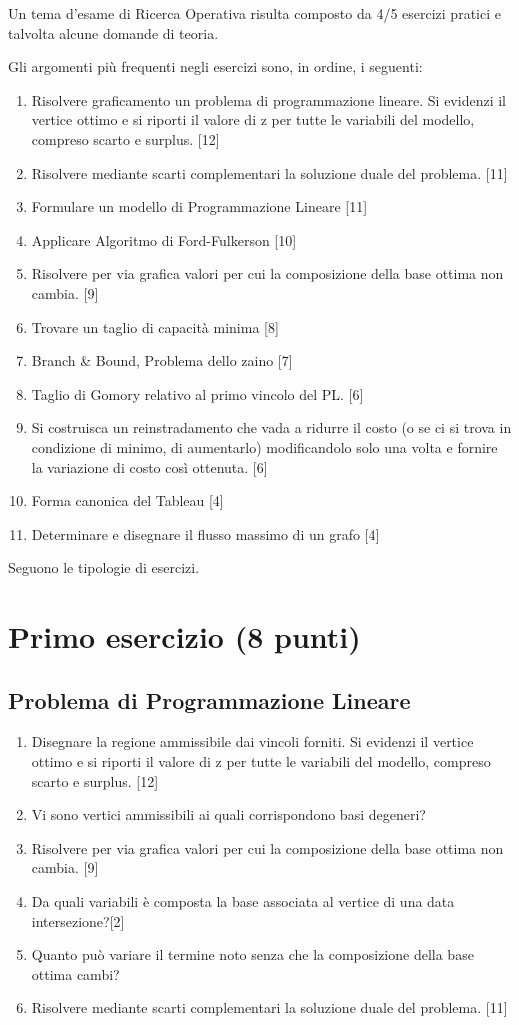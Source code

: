 \documentclass[\main/main.tex]{subfiles}
\begin{document}
Un tema d'esame di Ricerca Operativa risulta composto da 4/5 esercizi pratici e talvolta alcune domande di teoria.

Gli argomenti più frequenti negli esercizi sono, in ordine, i seguenti:

\begin{enumerate}
  \item Risolvere graficamento un problema di programmazione lineare. Si evidenzi il vertice ottimo e si riporti il valore di z per tutte le variabili del modello, compreso scarto e surplus. [12]
  \item Risolvere mediante scarti complementari la soluzione duale del problema. [11]
  \item Formulare un modello di Programmazione Lineare [11]
  \item Applicare Algoritmo di Ford-Fulkerson [10]
  \item Risolvere per via grafica valori per cui la composizione della base ottima non cambia. [9]
  \item Trovare un taglio di capacità minima [8]
  \item Branch \& Bound, Problema dello zaino [7]
  \item Taglio di Gomory relativo al primo vincolo del PL. [6]
  \item Si costruisca un reinstradamento che vada a ridurre il costo (o se ci si trova in condizione di minimo, di aumentarlo) modificandolo solo una volta e fornire la variazione di costo così ottenuta. [6]
  \item Forma canonica del Tableau [4]
  \item Determinare e disegnare il flusso massimo di un grafo [4]
\end{enumerate}

Seguono le tipologie di esercizi.

\section{Primo esercizio (8 punti)}

\subsection{Problema di Programmazione Lineare}
\begin{enumerate}
  \item Disegnare la regione ammissibile dai vincoli forniti. Si evidenzi il vertice ottimo e si riporti il valore di z per tutte le variabili del modello, compreso scarto e surplus. [12]
  \item Vi sono vertici ammissibili ai quali corrispondono basi degeneri?
  \item Risolvere per via grafica valori per cui la composizione della base ottima non cambia. [9]
  \item Da quali variabili è composta la base associata al vertice di una data intersezione?[2]
  \item Quanto può variare il termine noto senza che la composizione della base ottima cambi?
  \item Risolvere mediante scarti complementari la soluzione duale del problema. [11]
\end{enumerate}
\end{document}
